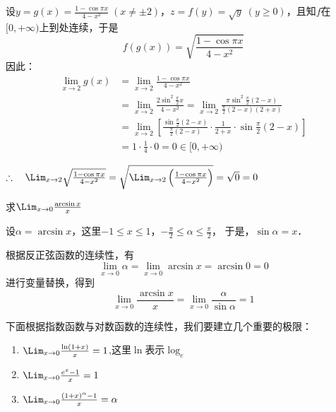 \begin{solution}
设$y=g(x)=\frac{1-\cos\pi x}{4-x^2}\; (x\ne \pm 2)$，$z=f(y)=\sqrt{y}\; (y\ge 0)$，且知$f$在$[0,+\infty)$上到处连续，于是
\[f(g(x))=\sqrt{\frac{1-\cos\pi x}{4-x^2}}\]
因此：
\[\begin{split}
    \lim_{x\to 2}g(x)&=\lim_{x\to 2}\frac{1-\cos \pi x}{4-x^2}\\
    &=\lim_{x\to 2}\frac{2\sin^2\frac{\pi}{2}x}{4-x^2}=\lim_{x\to 2}\frac{\pi\sin^2\frac{\pi}{2}(2-x)}{\frac{\pi}{2}(2-x)(2+x)}\\
    &=\lim_{x\to 2}\left[\frac{\sin\frac{\pi}{2}(2-x)}{\frac{\pi}{2}(2-x)}\cdot \frac{1}{2+x}\cdot \sin\frac{\pi}{2}(2-x)  \right]\\
    &=1\cdot \frac{1}{4}\cdot 0=0\in [0,+\infty)
\end{split}\]

$\therefore\quad \Lim_{x\to 2}\sqrt{\frac{1-\cos\pi x}{4-x^2}}=\sqrt{\Lim_{x\to 2}\left(\frac{1-\cos\pi x}{4-x^2}\right)}=\sqrt{0}=0$
\end{solution}

\begin{example}
    求$\Lim_{x\to 0}\frac{\arcsin x}{x}$
\end{example}

\begin{solution}
设$\alpha=\arcsin x$，这里$-1\le x\le 1$，$-\frac{\pi}{2}\le\alpha\le \frac{\pi}{2}$，
于是，$\sin\alpha=x$．

根据反正弦函数的连续性，有
\[\lim_{x\to 0} \alpha=\lim_{x\to 0}\arcsin x=\arcsin 0=0\]
进行变量替换，得到
\[\lim_{x\to 0} \frac{\arcsin x}{x}=\lim_{x\to 0}\frac{\alpha}{\sin\alpha}=1\]
\end{solution}

下面根据指数函数与对数函数的连续性，我们要建立几个重要的极限：
\begin{enumerate}
    \item $\Lim_{x\to 0} \frac{\ln(1+x)}{x}=1$,\quad 这里$\ln$表示$\log_e$
    \item $\Lim_{x\to 0}\frac{e^x-1}{x}=1$
    \item $\Lim_{x\to 0}\frac{(1+x)^\alpha -1}{x}=\alpha$
\end{enumerate}

